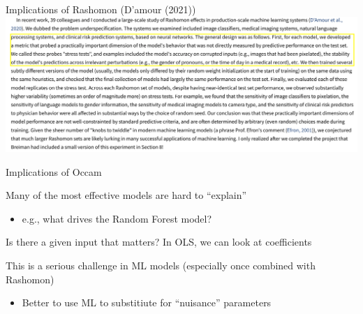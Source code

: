 \documentclass[notes,11pt, aspectratio=169]{beamer}
\newenvironment{wideitemize}{\itemize\addtolength{\itemsep}{10pt}}{\enditemize}
\begin{document}
\begin{frame}{Implications of Rashomon (D'amour (2021))} 
  \includegraphics[width=0.8\linewidth]{images/rashomon_stresstest.png}
\end{frame}

\begin{frame}{Implications of Occam}
  \begin{wideitemize}
  \item Many of the most effective models are hard to ``explain''
    \begin{itemize}
    \item e.g., what drives the Random Forest model?
    \end{itemize}
  \item Is there a given input that matters? In OLS, we can look at coefficients
  \item This is a serious challenge in ML models (especially once
    combined with Rashomon)
    \begin{itemize}
    \item Better to use ML to substitiute for ``nuisance'' parameters
    \end{itemize}
  \end{wideitemize}
\end{frame}
\end{document}
